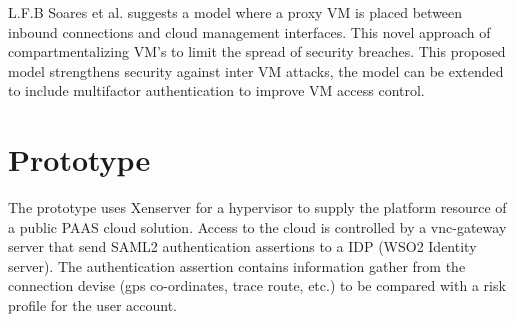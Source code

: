 \documentclass[11pt]{article}
\begin{document}
L.F.B Soares et al. \cite{Soares2013} suggests a model where a proxy  VM is placed between inbound connections and cloud management interfaces. This novel approach of compartmentalizing VM's to limit the spread of security breaches. This proposed model strengthens security against inter VM attacks, the model can be extended to include multifactor authentication to improve VM access control.

\section{Prototype}
The prototype uses Xenserver for a hypervisor to supply the platform resource of a public PAAS cloud solution. Access to the cloud is controlled by a vnc-gateway server that send SAML2 authentication assertions to a IDP (WSO2 Identity server). The authentication assertion contains information gather from the connection devise (gps co-ordinates, trace route, etc.) to be compared with a risk profile for the user account.    



\end{document}
